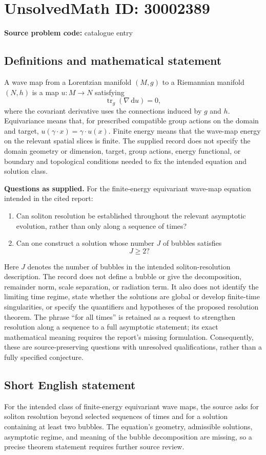 \documentclass[11pt]{article}
\newcommand{\dd}{\,\mathrm{d}}
\begin{document}
\section*{UnsolvedMath ID: 30002389}
\textbf{Source problem code:} catalogue entry
\subsection{Definitions and mathematical statement}
A wave map from a Lorentzian manifold \((M,g)\) to a Riemannian manifold \((N,h)\) is a map \(u:M\to N\) satisfying
\[
\operatorname{tr}_g(\nabla \dd u)=0,
\]
where the covariant derivative uses the connections induced by \(g\) and \(h\). Equivariance means that, for prescribed compatible group actions on the domain and target, \(u(\gamma\cdot x)=\gamma\cdot u(x)\). Finite energy means that the wave-map energy on the relevant spatial slices is finite. The supplied record does not specify the domain geometry or dimension, target, group actions, energy functional, or boundary and topological conditions needed to fix the intended equation and solution class.

\textbf{Questions as supplied.} For the finite-energy equivariant wave-map equation intended in the cited report:
\begin{enumerate}
\item Can soliton resolution be established throughout the relevant asymptotic evolution, rather than only along a sequence of times?
\item Can one construct a solution whose number \(J\) of bubbles satisfies
\[
J\geq 2?
\]
\end{enumerate}
Here \(J\) denotes the number of bubbles in the intended soliton-resolution description. The record does not define a bubble or give the decomposition, remainder norm, scale separation, or radiation term. It also does not identify the limiting time regime, state whether the solutions are global or develop finite-time singularities, or specify the quantifiers and hypotheses of the proposed resolution theorem. The phrase ``for all times'' is retained as a request to strengthen resolution along a sequence to a full asymptotic statement; its exact mathematical meaning requires the report's missing formulation. Consequently, these are source-preserving questions with unresolved qualifications, rather than a fully specified conjecture.
\subsection{Short English statement}
For the intended class of finite-energy equivariant wave maps, the source asks for soliton resolution beyond selected sequences of times and for a solution containing at least two bubbles. The equation's geometry, admissible solutions, asymptotic regime, and meaning of the bubble decomposition are missing, so a precise theorem statement requires further source review.
\end{document}
